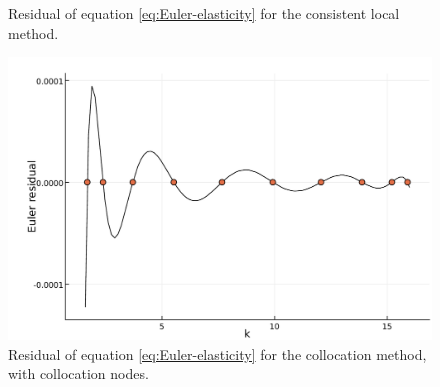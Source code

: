 \documentclass[a4paper,11pt]{article}
\newcommand{\figwidth}{\linewidth}
\begin{document}
\begin{figure}[b]
\begin{minipage}[t]{0.48\linewidth}
    \caption{Residual of equation \eqref{eq:Euler-elasticity} for the consistent local method.}
    \label{fig:euler-residual-consistentlocal}
  \end{minipage}\hfill%
  \begin{minipage}[t]{0.48\linewidth}
    \includegraphics[width=\figwidth]{../fig/eulerresid-collocation.pdf}
    \caption{Residual of equation \eqref{eq:Euler-elasticity} for the collocation method, with collocation nodes.}
    \label{fig:eulerresid-collocation}
  \end{minipage}
\end{figure}
\end{document}
